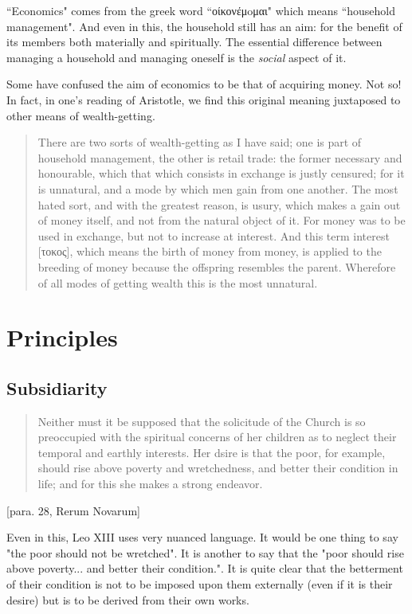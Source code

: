 \documentclass[letterpaper]{article}
\begin{document}
``Economics" comes from the greek word ``οίκονέμoμαι" which means ``household management". And even in this, the household still has an aim: for the benefit of its members both materially and spiritually. The essential difference between managing a household and managing oneself is the \textit{social} aspect of it.

Some have confused the aim of economics to be that of acquiring money. Not so! In fact, in one's reading of Aristotle, we find this original meaning juxtaposed to other means of wealth-getting.

\begin{quote}
  There are two sorts of wealth-getting as I have said; one is part of household management, the other is retail trade: the former necessary and honourable, which that which consists in exchange is justly censured; for it is unnatural, and a mode by which men gain from one another. The most hated sort, and with the greatest reason, is usury, which makes a gain out of money itself, and not from the natural object of it. For money was to be used in exchange, but not to increase at interest. And this term interest [τοκος], which means the birth of money from money, is applied to the breeding of money because the offspring resembles the parent. Wherefore of all modes of getting wealth this is the most unnatural.
\end{quote}

\section{Principles}

\subsection{Subsidiarity}

\begin{quote}
  Neither must it be supposed that the solicitude of the Church is so preoccupied with the spiritual concerns of her children as to neglect their temporal and earthly interests. Her dsire is that the poor, for example, should rise above poverty and wretchedness, and better their condition in life; and for this she makes a strong endeavor.
\end{quote} [para. 28, Rerum Novarum]

Even in this, Leo XIII uses very nuanced language. It would be one thing to say "the poor should not be wretched". It is another to say that the "poor should rise above poverty... and better their condition.".  It is quite clear that the betterment of their condition is not to be imposed upon them externally (even if it is their desire) but is to be derived from their own works.
\end{document}
